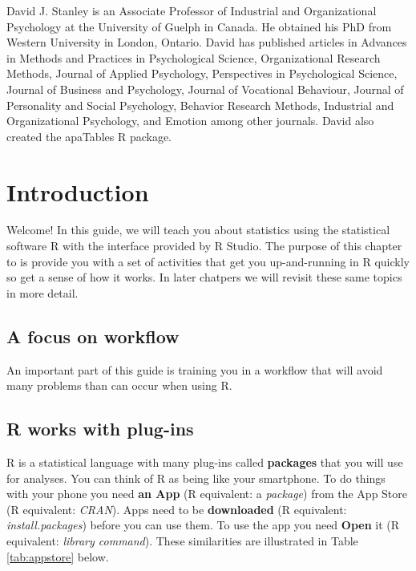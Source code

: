 \documentclass[
]{krantz}
\begin{document}
David J. Stanley is an Associate Professor of Industrial and Organizational Psychology at the University of Guelph in Canada. He obtained his PhD from Western University in London, Ontario. David has published articles in Advances in Methods and Practices in Psychological Science, Organizational Research Methods, Journal of Applied Psychology, Perspectives in Psychological Science, Journal of Business and Psychology, Journal of Vocational Behaviour, Journal of Personality and Social Psychology, Behavior Research Methods, Industrial and Organizational Psychology, and Emotion among other journals. David also created the apaTables R package.

\mainmatter

\hypertarget{introduction}{%
\chapter{Introduction}\label{introduction}}

Welcome! In this guide, we will teach you about statistics using the statistical software R with the interface provided by R Studio. The purpose of this chapter to is provide you with a set of activities that get you up-and-running in R quickly so get a sense of how it works. In later chatpers we will revisit these same topics in more detail.

\hypertarget{a-focus-on-workflow}{%
\section{A focus on workflow}\label{a-focus-on-workflow}}

An important part of this guide is training you in a workflow that will avoid many problems than can occur when using R.

\hypertarget{r-works-with-plug-ins}{%
\section{R works with plug-ins}\label{r-works-with-plug-ins}}

R is a statistical language with many plug-ins called \textbf{packages} that you will use for analyses. You can think of R as being like your smartphone. To do things with your phone you need \textbf{an App} (R equivalent: a \emph{package}) from the App Store (R equivalent: \emph{CRAN}). Apps need to be \textbf{downloaded} (R equivalent: \emph{install.packages}) before you can use them. To use the app you need \textbf{Open} it (R equivalent: \emph{library command}). These similarities are illustrated in Table \ref{tab:appstore} below.
\end{document}
